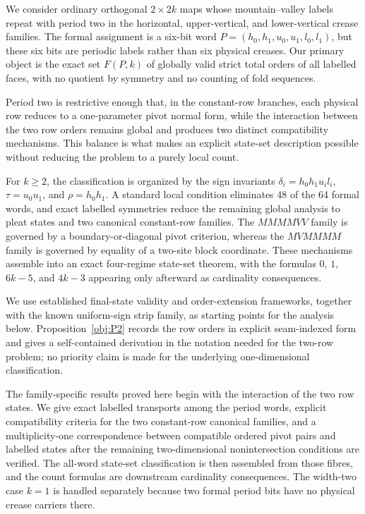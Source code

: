 \documentclass[11pt]{article}
\theoremstyle{definition}
\theoremstyle{remark}
\begin{document}
We consider ordinary orthogonal $2\times 2k$ maps whose mountain--valley labels repeat with period two in the horizontal, upper-vertical, and lower-vertical crease families. The formal assignment is a six-bit word $P=(h_0,h_1,u_0,u_1,l_0,l_1)$, but these six bits are periodic labels rather than six physical creases. Our primary object is the exact set $F(P,k)$ of globally valid strict total orders of all labelled faces, with no quotient by symmetry and no counting of fold sequences.

Period two is restrictive enough that, in the constant-row branches, each physical row reduces to a one-parameter pivot normal form, while the interaction between the two row orders remains global and produces two distinct compatibility mechanisms. This balance is what makes an explicit state-set description possible without reducing the problem to a purely local count.

For $k\ge2$, the classification is organized by the sign invariants $\delta_i=h_0h_1u_il_i$, $\tau=u_0u_1$, and $\rho=h_0h_1$. A standard local condition eliminates 48 of the 64 formal words, and exact labelled symmetries reduce the remaining global analysis to pleat states and two canonical constant-row families. The $MMMMVV$ family is governed by a boundary-or-diagonal pivot criterion, whereas the $MVMMMM$ family is governed by equality of a two-site block coordinate. These mechanisms assemble into an exact four-regime state-set theorem, with the formulas $0$, $1$, $6k-5$, and $4k-3$ appearing only afterward as cardinality consequences.

We use established final-state validity and order-extension frameworks, together with the known uniform-sign strip family, as starting points for the analysis below. Proposition~\ref{obj:P2} records the row orders in explicit seam-indexed form and gives a self-contained derivation in the notation needed for the two-row problem; no priority claim is made for the underlying one-dimensional classification.

The family-specific results proved here begin with the interaction of the two row states. We give exact labelled transports among the period words, explicit compatibility criteria for the two constant-row canonical families, and a multiplicity-one correspondence between compatible ordered pivot pairs and labelled states after the remaining two-dimensional nonintersection conditions are verified. The all-word state-set classification is then assembled from those fibres, and the count formulas are downstream cardinality consequences. The width-two case $k=1$ is handled separately because two formal period bits have no physical crease carriers there.
\end{document}
